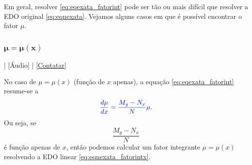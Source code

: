 Em geral, resolver \eqref{eq:eqexata_fatorint} pode ser tão ou mais difícil que resolver a EDO original \eqref{eq:eqnexata}. Vejamos alguns casos em que é possível encontrar o fator $\mu$.

\subsubsection{$\pmb{\mu = \mu(x)}$}

\begin{flushright}
  [Vídeo] | [Áudio] | \href{https://phkonzen.github.io/notas/contato.html}{[Contatar]}
\end{flushright}

No caso de $\mu = \mu(x)$ (função de $x$ apenas), a equação \eqref{eq:eqexata_fatorint} resume-se a
\begin{equation}\label{eq:eqnexata_fatorintx}
  {\color{blue}\frac{d\mu}{dx} = \frac{M_y-N_x}{N}\mu}.
\end{equation}
Ou seja, se
\begin{equation}
  \frac{M_y-N_x}{N}
\end{equation}
é função apenas de $x$, então podemos calcular um fator integrante $\mu = \mu(x)$ resolvendo a EDO linear \eqref{eq:eqnexata_fatorintx}.

